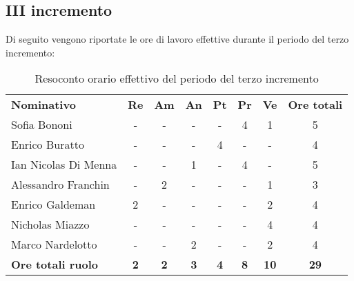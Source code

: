 \documentclass[../piano-di-progetto.tex]{subfiles}
\begin{document}
\subsection{III incremento}

Di seguito vengono riportate le ore di lavoro effettive durante il periodo del terzo incremento:
\begin{table}[H]
    \centering
    \begin{tabular}{lccccccc}
      \rowcolor{lightgray}
      \textbf{Nominativo}       & \textbf{Re}      & \textbf{Am} & \textbf{An}      & \textbf{Pt} & \textbf{Pr} & \textbf{Ve} & \textbf{Ore totali} \\
Sofia Bononi              & -          & -          & -          & -          & 4          & 1           & 5           \\
Enrico Buratto            & -          & -          & -          & 4          & -          & -           & 4           \\
Ian Nicolas Di Menna      & -          & -          & 1          & -          & 4          & -           & 5           \\
Alessandro Franchin       & -          & 2          & -          & -          & -          & 1           & 3           \\
Enrico Galdeman           & 2          & -          & -          & -          & -          & 2           & 4           \\
Nicholas Miazzo           & -          & -          & -          & -          & -          & 4           & 4           \\
Marco Nardelotto          & -          & -          & 2          & -          & -          & 2           & 4           \\
\textbf{Ore totali ruolo} & \textbf{2} & \textbf{2} & \textbf{3} & \textbf{4} & \textbf{8} & \textbf{10} & \textbf{29}

    \end{tabular}
    \caption{Resoconto orario effettivo del periodo del terzo incremento}
  \end{table}
\end{document}
